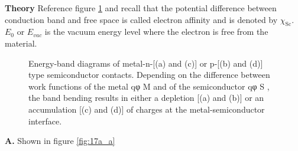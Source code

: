 \documentclass[main.tex]{subfiles}
\begin{document}
\begin{enumerate}
\begin{enumerate}
        \textbf{Theory} Reference figure \ref{fig:17t_a} and recall that the potential difference between conduction band and free space is called electron affinity and is denoted by $\chi_{\mathrm{Sc}}$. $E_0$ or $E_{vac}$ is the vacuum energy level where the electron is free from the material.

        \begin{figure}
        \centering{}
        \caption{Energy-band diagrams of metal-n-[(a) and (c)] or p-[(b) and (d)] type semiconductor contacts. Depending on the difference between work functions of the metal qφ M and of the semiconductor qφ S , the band bending results in either a depletion [(a) and (b)] or an accumulation [(c) and (d)] of charges at the metal-semiconductor interface.}
        \label{fig:17t_a}
        \end{figure}
        
        \textbf{A.} Shown in figure \ref{fig:17a_a} 


\end{enumerate}
\end{enumerate}
\end{document}
